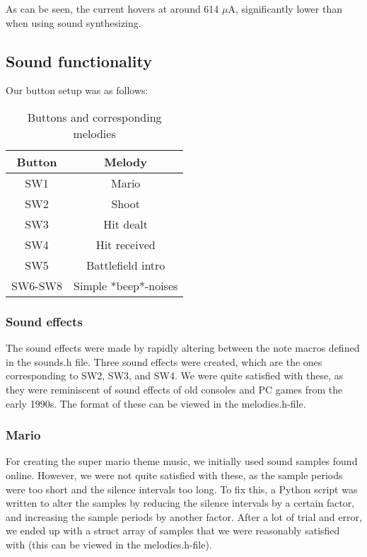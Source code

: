 

As can be seen, the current hovers at around 614 $\mu$A, significantly lower than when using sound synthesizing.

\subsection{Sound functionality}

Our button setup was as follows:

\begin{table}[ht]
\caption{Buttons and corresponding melodies}
\centering
\begin{tabular}{c c}
\hline
\hline %
Button & Melody \\ [0.5ex]
\hline
SW1 & Mario \\
SW2 & Shoot \\
SW3 & Hit dealt \\
SW4 & Hit received \\
SW5 & Battlefield intro \\
SW6-SW8 & Simple *beep*-noises \\
\hline
\end{tabular}
\label{table:nonlin}
\end{table}

\subsubsection{Sound effects}

The sound effects were made by rapidly altering between the note macros defined in the sounds.h file. Three sound effects were created, which are the ones corresponding to SW2, SW3, and SW4. We were quite satisfied with these, as they were reminiscent of sound effects of old consoles and PC games from the early 1990s. The format of these can be viewed in the melodies.h-file.

\subsubsection{Mario}

For creating the super mario theme music, we initially used sound samples found online. However, we were not quite satisfied with these, as the sample periods were too short and the silence intervals too long. To fix this, a Python script was written to alter the samples by reducing the silence intervals by a certain factor, and increasing the sample periods by another factor. After a lot of trial and error, we ended up with a struct array of samples that we were reasonably satisfied with (this can be viewed in the melodies.h-file).

